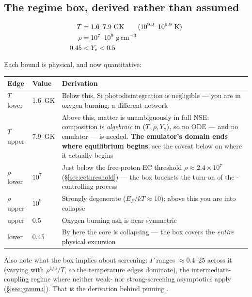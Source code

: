 \subsection{The regime box, derived rather than assumed}
\label{sec:regimebox}

\begin{align*}
T &= 1.6\text{--}7.9\ \mathrm{GK} \qquad (10^{9.2}\text{--}10^{9.9}\ \mathrm{K})\\
\rho &= 10^{7}\text{--}10^{9}\ \gcc\\
0.45 &< Y_e < 0.5
\end{align*}

Each bound is physical, and now quantitative:

\begin{center}
\small
\begin{tabularx}{\textwidth}{@{}l l Y@{}}
\toprule
\textbf{Edge} & \textbf{Value} & \textbf{Derivation} \\
\midrule
$T$ lower & 1.6~GK &
  Below this, Si photodisintegration is negligible --- you are in oxygen
  burning, a different network \\
$T$ upper & 7.9~GK &
  Above this, matter is unambiguously in full NSE: composition is
  \emph{algebraic} in $(T,\rho,Y_{e})$, so no ODE --- and no emulator --- is
  needed. \textbf{The emulator's domain ends where equilibrium begins}; see the
  caveat below on where it actually begins \\
$\rho$ lower & $10^{7}$ &
  Just below the free-proton EC threshold $\rho \approx 2.4\times10^{7}$
  (\S\ref{sec:ecthreshold}) --- the box brackets the turn-on of the
  \Ye{}-controlling process \\
$\rho$ upper & $10^{9}$ &
  Strongly degenerate ($E_F/kT \approx 10$); above this you are into collapse \\
\Ye{} upper & 0.5 & Oxygen-burning ash is near-symmetric \\
\Ye{} lower & 0.45 &
  By here the core is collapsing --- the box covers the \emph{entire} physical
  excursion \\
\bottomrule
\end{tabularx}
\end{center}

Also note what the box implies about screening: $\Gamma$ ranges
$\approx 0.4$--25 across it (varying with $\rho^{1/3}/T$, so the temperature
edges dominate), the intermediate-coupling regime where neither weak- nor
strong-screening asymptotics apply (\S\ref{sec:gamma}). That is the derivation
behind pinning .

